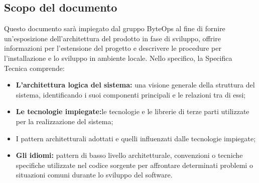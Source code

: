 \subsection{Scopo del documento}
Questo documento sarà impiegato dal gruppo ByteOps al fine di fornire un'esposizione dell'architettura del prodotto in fase di sviluppo, offrire informazioni per l'estensione del progetto e descrivere le procedure per l'installazione e lo sviluppo in ambiente locale. Nello specifico, la Specifica Tecnica comprende:
\begin{itemize}
    \item  \textbf{L'architettura logica del sistema:} una visione generale della struttura del sistema, identificando i suoi componenti principali e le relazioni tra di essi;
    \item  \textbf{Le tecnologie impiegate:}le tecnologie e le librerie di terze parti utilizzate per la realizzazione del sistema;
    \item  I pattern architetturali adottati e quelli influenzati dalle tecnologie impiegate;
    \item \textbf{Gli idiomi:} pattern di basso livello architetturale, convenzioni o tecniche specifiche utilizzate nel codice sorgente per affrontare determinati problemi o situazioni comuni durante lo sviluppo del software.
\end{itemize}

